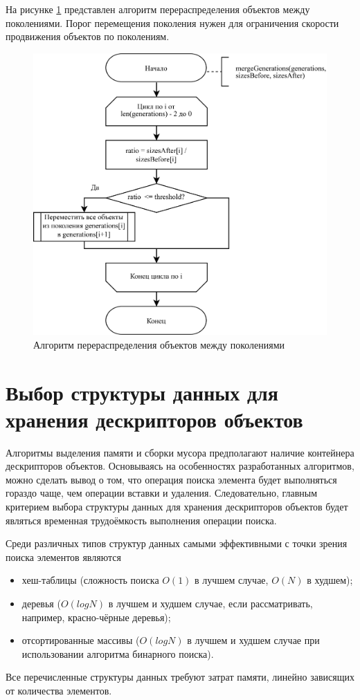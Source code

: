 На рисунке \ref{fig:relocate} представлен алгоритм перераспределения объектов между поколениями. Порог перемещения поколения нужен для ограничения скорости продвижения объектов по поколениям.

\begin{figure}[H]
	\centering
	\includegraphics[scale=0.185]{assets/relocate.png}
	\caption{Алгоритм перераспределения объектов между поколениями}
	\label{fig:relocate}
\end{figure}




\section{Выбор структуры данных для хранения дескрипторов объектов}

Алгоритмы выделения памяти и сборки мусора предполагают наличие контейнера дескрипторов объектов. Основываясь на особенностях разработанных алгоритмов, можно сделать вывод о том, что операция поиска элемента будет выполняться гораздо чаще, чем операции вставки и удаления. Следовательно, главным критерием выбора структуры данных для хранения дескрипторов объектов будет являться временная трудоёмкость выполнения операции поиска.

Среди различных типов структур данных самыми эффективными с точки зрения поиска элементов являются
\begin{itemize}[label*=---]
	\item хеш-таблицы (сложность поиска $O(1)$ в лучшем случае, $O(N)$ в худшем);
	\item деревья ($O(log N)$ в лучшем и худшем случае, если рассматривать, например, красно-чёрные деревья);
	\item отсортированные массивы ($O(log N)$ в лучшем и худшем случае при использовании алгоритма бинарного поиска).
\end{itemize}
Все перечисленные структуры данных требуют затрат памяти, линейно зависящих от количества элементов.

